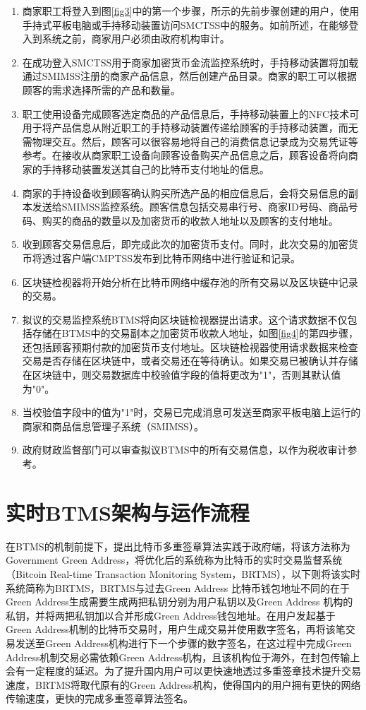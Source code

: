 		\begin{enumerate}
			\item 商家职工将登入到图\ref{fig3}中的第一个步骤，所示的先前步骤创建的用户，使用手持式平板电脑或手持移动装置访问SMCTSS中的服务。如前所述，在能够登入到系统之前，商家用户必须由政府机构审计。
			\item 在成功登入SMCTSS用于商家加密货币金流监控系统时，手持移动装置将加载通过SMIMSS注册的商家产品信息，然后创建产品目录。商家的职工可以根据顾客的需求选择所需的产品和数量。

			\item 职工使用设备完成顾客选定商品的产品信息后，手持移动装置上的NFC技术可用于将产品信息从附近职工的手持移动装置传递给顾客的手持移动装置，而无需物理交互。然后，顾客可以很容易地将自己的消费信息记录成为交易凭证等参考。在接收从商家职工设备向顾客设备购买产品信息之后，顾客设备将向商家的手持移动装置发送其自己的比特币支付地址的信息。
			\item 商家的手持设备收到顾客确认购买所选产品的相应信息后，会将交易信息的副本发送给SMIMSS监控系统。顾客信息包括交易串行号、商家ID号码、商品号码、购买的商品的数量以及加密货币的收款人地址以及顾客的支付地址。
			\item 收到顾客交易信息后，即完成此次的加密货币支付。同时，此次交易的加密货币将透过客户端CMPTSS发布到比特币网络中进行验证和记录。
			\item 区块链检视器将开始分析在比特币网络中缓存池的所有交易以及区块链中记录的交易。
			\item 拟议的交易监控系统BTMS将向区块链检视器提出请求。这个请求数据不仅包括存储在BTMS中的交易副本之加密货币收款人地址，如图\ref{fig4}的第四步骤，还包括顾客预期付款的加密货币支付地址。区块链检视器使用请求数据来检查交易是否存储在区块链中，或者交易还在等待确认。如果交易已被确认并存储在区块链中，则交易数据库中校验值字段的值将更改为"1"，否则其默认值为"0"。
			\item 当校验值字段中的值为"1"时，交易已完成消息可发送至商家平板电脑上运行的商家和商品信息管理子系统（SMIMSS）。
			\item 政府财政监督部门可以审查拟议BTMS中的所有交易信息，以作为税收审计参考。
		\end{enumerate}

\section{实时BTMS架构与运作流程}

		在BTMS的机制前提下，提出比特币多重签章算法实践于政府端，将该方法称为Government Green Address，将优化后的系统称为比特币的实时交易监督系统（Bitcoin Real-time Transaction Monitoring System，BRTMS），以下则将该实时系统简称为BRTMS，BRTMS与过去Green Address 比特币钱包地址不同的在于Green Address生成需要生成两把私钥分别为用户私钥以及Green Address 机构的私钥，并将两把私钥加以合并形成Green Address钱包地址。在用户发起基于Green Address机制的比特币交易时，用户生成交易并使用数字签名，再将该笔交易发送至Green Address机构进行下一个步骤的数字签名，在这过程中完成Green Address机制交易必需依赖Green Address机构，且该机构位于海外，在封包传输上会有一定程度的延迟。为了提升国内用户可以更快速地透过多重签章技术提升交易速度，BRTMS将取代原有的Green Address机构，使得国内的用户拥有更快的网络传输速度，更快的完成多重签章算法签名。 

